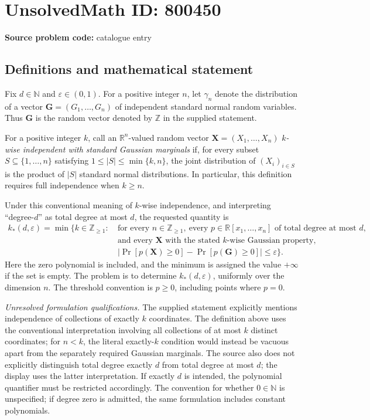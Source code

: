 \documentclass[11pt]{article}
\newcommand{\N}{\mathbb{N}}
\newcommand{\Z}{\mathbb{Z}}
\newcommand{\R}{\mathbb{R}}
\begin{document}
\section*{UnsolvedMath ID: 800450}
\textbf{Source problem code:} catalogue entry
\subsection{Definitions and mathematical statement}
Fix \(d\in\N\) and \(\varepsilon\in(0,1)\). For a positive integer \(n\), let \(\gamma_n\) denote the distribution of a vector \(\mathbf{G}=(G_1,\ldots,G_n)\) of independent standard normal random variables. Thus \(\mathbf{G}\) is the random vector denoted by \(\mathbb{Z}\) in the supplied statement.

For a positive integer \(k\), call an \(\R^n\)-valued random vector \(\mathbf{X}=(X_1,\ldots,X_n)\) \emph{\(k\)-wise independent with standard Gaussian marginals} if, for every subset \(S\subseteq\{1,\ldots,n\}\) satisfying \(1\leq |S|\leq\min\{k,n\}\), the joint distribution of \((X_i)_{i\in S}\) is the product of \(|S|\) standard normal distributions. In particular, this definition requires full independence when \(k\geq n\).

Under this conventional meaning of \(k\)-wise independence, and interpreting ``degree-\(d\)'' as total degree at most \(d\), the requested quantity is
\[
\begin{split}
k_*(d,\varepsilon)=\min\bigl\{k\in\Z_{\geq1}:{}&\ \text{for every }n\in\Z_{\geq1},\ \text{every }p\in\R[x_1,\ldots,x_n]
\text{ of total degree at most }d,\\
&\ \text{and every }\mathbf{X}\text{ with the stated }k\text{-wise Gaussian property},\\
&\ \bigl|\Pr[p(\mathbf{X})\geq0]-\Pr[p(\mathbf{G})\geq0]\bigr|\leq\varepsilon
\bigr\}.
\end{split}
\]
Here the zero polynomial is included, and the minimum is assigned the value \(+\infty\) if the set is empty. The problem is to determine \(k_*(d,\varepsilon)\), uniformly over the dimension \(n\). The threshold convention is \(p\geq0\), including points where \(p=0\).

\emph{Unresolved formulation qualifications.} The supplied statement explicitly mentions independence of collections of exactly \(k\) coordinates. The definition above uses the conventional interpretation involving all collections of at most \(k\) distinct coordinates; for \(n<k\), the literal exactly-\(k\) condition would instead be vacuous apart from the separately required Gaussian marginals. The source also does not explicitly distinguish total degree exactly \(d\) from total degree at most \(d\); the display uses the latter interpretation. If exactly \(d\) is intended, the polynomial quantifier must be restricted accordingly. The convention for whether \(0\in\N\) is unspecified; if degree zero is admitted, the same formulation includes constant polynomials.
\end{document}
